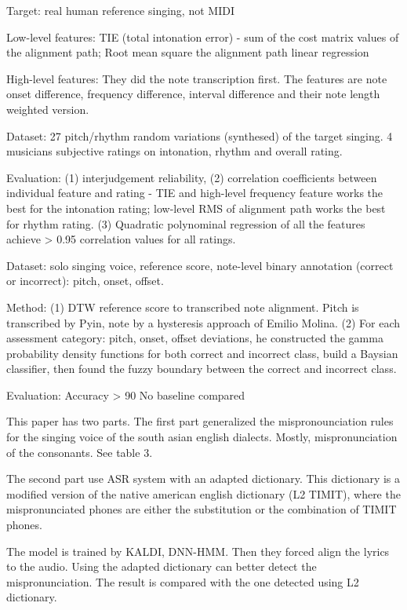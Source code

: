 Target: real human reference singing, not MIDI

Low-level features: TIE (total intonation error) - sum of the cost matrix values of the alignment path; Root mean square the alignment path linear regression

High-level features: They did the note transcription first. The features are note onset difference, frequency difference, interval difference and their note length weighted version.

Dataset: 27 pitch/rhythm random variations (synthesed) of the target singing. 4 musicians subjective ratings on intonation, rhythm and overall rating.

Evaluation: 
(1) interjudgement reliability, 
(2) correlation coefficients between individual feature and rating - TIE and high-level frequency feature works the best for the intonation rating; low-level RMS of alignment path works the best for rhythm rating.
(3) Quadratic polynominal regression of all the features achieve > 0.95 correlation values for all ratings.

 Dataset: solo singing voice, reference score, note-level binary annotation (correct or incorrect): pitch, onset, offset.

Method:
(1) DTW reference score to transcribed note alignment. Pitch is transcribed by Pyin, note by a hysteresis approach of Emilio Molina.
(2) For each assessment category: pitch, onset, offset deviations, he constructed the gamma probability density functions for both correct and incorrect class, build a Baysian classifier, then found the fuzzy boundary between the correct and incorrect class.

Evaluation:
Accuracy > 90%
No baseline compared

 This paper has two parts. The first part generalized the mispronounciation rules for the singing voice of the south asian english dialects. Mostly, mispronunciation of the consonants. See table 3.

The second part use ASR system with an adapted dictionary. This dictionary is a modified version of the native american english dictionary (L2 TIMIT), where the mispronunciated phones are either the substitution or the combination of TIMIT phones.

The model is trained by KALDI, DNN-HMM. Then they forced align the lyrics to the audio. Using the adapted dictionary can better detect the mispronunciation. The result is compared with the one detected using L2 dictionary.

